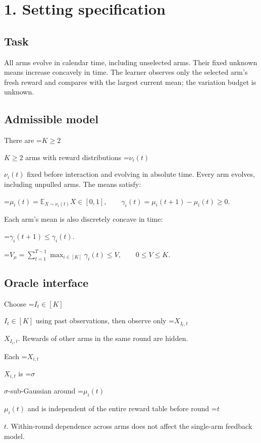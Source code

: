 \documentclass[10pt,a4paper]{article}
\newcommand{\AtlasMath}[1]{\par\begingroup\centering\setbox0=\hbox{$\displaystyle #1$}\ifdim\wd0>1.4\linewidth\typeout{ATLAS WIDE FORMULA: \the\wd0}\fi\ifdim\wd0>\linewidth\resizebox{\linewidth}{!}{\box0}\else\box0\fi\par\endgroup}
\newcommand{\AtlasInlineMath}[1]{\begingroup\setbox0=\hbox{$#1$}\ifdim\wd0>.4\linewidth\endgroup\AtlasMath{#1}\else\endgroup$#1$\fi}
\begin{document}
\section{1. Setting specification}


\subsection{Task}


All arms evolve in calendar time, including unselected arms. Their fixed unknown means increase concavely in time. The learner observes only the selected arm's fresh reward and compares with the largest current mean; the variation budget is unknown.



\subsection{Admissible model}


There are \AtlasInlineMath{K\ge2} arms with reward distributions \AtlasInlineMath{\nu_i(t)} fixed before interaction and evolving in absolute time. Every arm evolves, including unpulled arms. The means satisfy:




\AtlasMath{\mu_i(t)=\mathbb{E}_{X\sim\nu_i(t)}X\in[0,1],\qquad \gamma_i(t)=\mu_i(t+1)-\mu_i(t)\ge0.}




Each arm’s mean is also discretely concave in time:




\AtlasMath{\gamma_i(t+1)\le\gamma_i(t).}





\AtlasMath{V_\mu=\sum_{t=1}^{T-1}\max_{i\in[K]}\gamma_i(t)\le V,\qquad 0\le V\le K.}




\subsection{Oracle interface}


Choose \AtlasInlineMath{I_t\in[K]} using past observations, then observe only \AtlasInlineMath{X_{I_t,t}}. Rewards of other arms in the same round are hidden.



Each \AtlasInlineMath{X_{i,t}} is \AtlasInlineMath{\sigma}-sub-Gaussian around \AtlasInlineMath{\mu_i(t)} and is independent of the entire reward table before round \AtlasInlineMath{t}. Within-round dependence across arms does not affect the single-arm feedback model.
\end{document}
